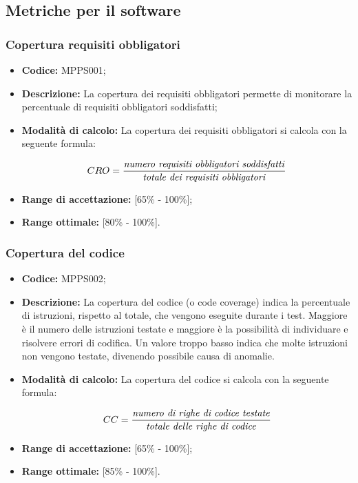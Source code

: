 \documentclass[../NormediProgetto.tex]{subfiles}
\begin{document}

\subsection{Metriche per il software}

\subsubsection{Copertura requisiti obbligatori}

\begin{itemize}
	\item \textbf{Codice:} MPPS001;
	\item \textbf{Descrizione:} La copertura dei requisiti obbligatori permette di monitorare la percentuale di requisiti obbligatori soddisfatti;
	\item \textbf{Modalità di calcolo:} La copertura dei requisiti obbligatori si calcola con la seguente formula:
	
	\[ CRO = \frac{\textrm{\textit{numero requisiti obbligatori soddisfatti}}}{\textrm{\textit{totale dei requisiti obbligatori}}} \]
	
	\item \textbf{Range di accettazione:} [65\% - 100\%];
	\item \textbf{Range ottimale:} [80\% - 100\%].
\end{itemize}

\subsubsection{Copertura del codice}

\begin{itemize}
	
	\item \textbf{Codice:} MPPS002;
	
	\item \textbf{Descrizione:} La copertura del codice (o code coverage) indica la percentuale di istruzioni,  rispetto al totale, che vengono eseguite durante i test. Maggiore è il numero delle istruzioni testate e maggiore è la possibilità di individuare e risolvere errori di codifica. Un valore troppo basso indica che molte istruzioni non vengono testate, divenendo possibile causa di anomalie.
	
	\item \textbf{Modalità di calcolo:} La copertura del codice si calcola con la seguente formula:
	
	\[ CC = \frac{\textrm{\textit{numero di righe di codice testate}}}{\textrm{\textit{totale delle righe di codice}}} \]
	
	\item \textbf{Range di accettazione:} [65\% - 100\%];
	\item \textbf{Range ottimale:} [85\% - 100\%].
\end{itemize}
\end{document}
